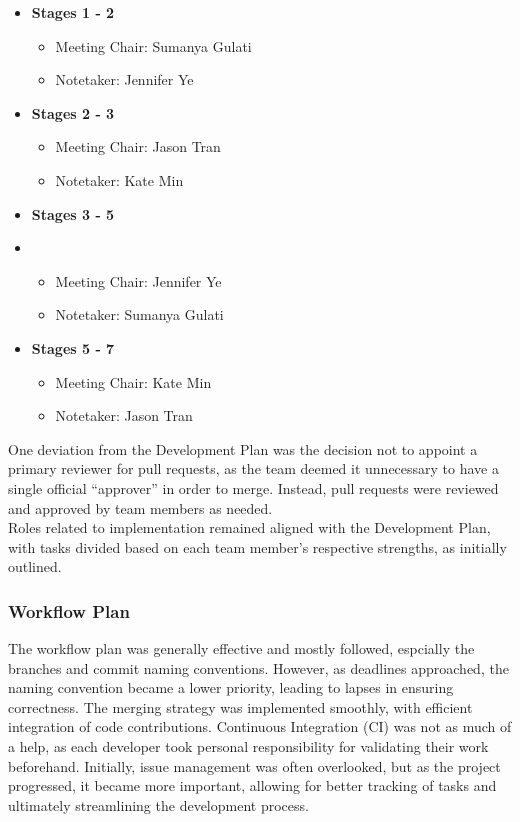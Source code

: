 \documentclass{article}
\begin{document}
\begin{itemize}
    \item \textbf{Stages 1 - 2}
        \begin{itemize}
            \item Meeting Chair: Sumanya Gulati
            \item Notetaker: Jennifer Ye
        \end{itemize}
    \item \textbf{Stages 2 - 3}
        \begin{itemize}
            \item Meeting Chair: Jason Tran
            \item Notetaker: Kate Min
        \end{itemize}
    \item \textbf{Stages 3 - 5}
    \item \begin{itemize}
            \item Meeting Chair: Jennifer Ye
            \item Notetaker: Sumanya Gulati
        \end{itemize}
    \item \textbf{Stages 5 - 7}
        \begin{itemize}
            \item Meeting Chair: Kate Min
            \item Notetaker: Jason Tran
        \end{itemize}
\end{itemize}

One deviation from the Development Plan was the decision not to appoint a
primary reviewer for pull requests, as the team deemed it unnecessary to have a
single official ``approver'' in order to merge. Instead, pull requests were
reviewed and approved by team members as needed. \\

Roles related to implementation remained aligned with the Development Plan, with
tasks divided based on each team member's respective strengths, as initially
outlined.

\subsubsection{Workflow Plan}
The workflow plan was generally effective and mostly followed, espcially the
branches and commit naming conventions. However, as deadlines approached, the
naming convention became a lower priority, leading to lapses in ensuring
correctness. The merging strategy was implemented smoothly, with efficient
integration of code contributions. Continuous Integration (CI) was not as much
of a help, as each developer took personal responsibility for validating their
work beforehand. Initially, issue management was often overlooked, but as the
project progressed, it became more important, allowing for better tracking of
tasks and ultimately streamlining the development process. 
\end{document}
